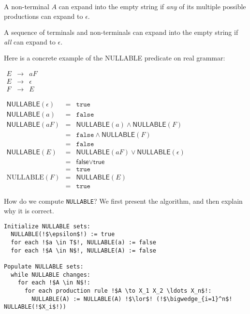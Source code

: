 A non-terminal $A$ can expand into the empty string if \textit{any} of its multiple possible productions can expand to $\epsilon$.

A sequence of terminals and non-terminals can expand into the empty string if \textit{all} can expand to $\epsilon$.

Here is a concrete example of the \textsf{NULLABLE} predicate on real grammar:

\begin{minipage}{0.4\textwidth}
$\begin{array}{rcl}
E &\to& a F \\
E &\to& \epsilon \\
F &\to& E
\end{array}$
\end{minipage}%
\begin{minipage}{0.6\textwidth}\footnotesize
  $\begin{array}{lcl}
\textsf{NULLABLE}(\epsilon) &=& \texttt{true}\\[1ex]
\textsf{NULLABLE}(a) &=& \texttt{false}\\[1ex]
\textsf{NULLABLE}(a F) &=& \textsf{NULLABLE} (a) \wedge \textsf{NULLABLE} (F) \\
              &=& \texttt{false} \wedge \textsf{NULLABLE} (F)\\
              &=& \texttt{false}\\[1ex]
\textsf{NULLABLE}(E) &=& \textsf{NULLABLE} (a F) \vee \textsf{NULLABLE} (\epsilon)\\
            &=& \textsf{false} \vee \textsf{true}\\
            &=& \texttt{true}\\[1ex]
\text{NULLABLE} (F) &=& \textsf{NULLABLE} (E)\\
            &=& \texttt{true}
\end{array}$ 
\end{minipage}

How do we compute \texttt{NULLABLE}? We first present the algorithm, and then explain why it is correct.

\begin{lstlisting}[style=pseudocode]
Initialize NULLABLE sets:
  NULLABLE(!$\epsilon$!) := true
  for each !$a \in T$!, NULLABLE(a) := false 
  for each !$A \in N$!, NULLABLE(A) := false

Populate NULLABLE sets:
  while NULLABLE changes: 
    for each !$A \in N$!:
      for each production rule !$A \to X_1 X_2 \ldots X_n$!:
        NULLABLE(A) := NULLABLE(A) !$\lor$! (!$\bigwedge_{i=1}^n$! NULLABLE(!$X_i$!))
\end{lstlisting}

